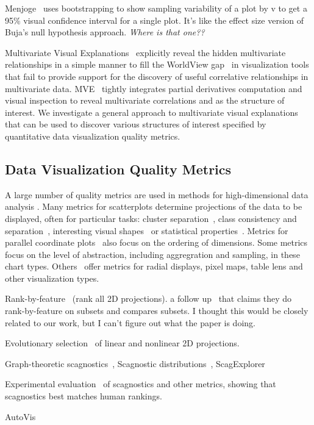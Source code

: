 Menjoge~\cite{Menjoge2010} uses bootstrapping to show sampling variability of a plot by v to get a 95\% visual confidence interval for a single plot. It's like the effect size version of Buja's null hypothesis approach. \textit{Where is that one??}

Multivariate Visual Explanations~\cite{Barlowe2008} explicitly reveal the hidden multivariate relationships in a simple manner to fill the WorldView gap~\cite{Amar2004} in visualization tools that fail to provide support for the discovery of useful correlative relationships in multivariate data. MVE~\cite{Barlowe2008}  tightly integrates partial derivatives computation and visual inspection to reveal multivariate correlations and as the structure of interest. We investigate a general approach to multivariate visual explanations that can be used to discover various structures of interest specified by quantitative data visualization quality metrics.

\subsection{Data Visualization Quality Metrics}
A large number of quality metrics are used in methods for high-dimensional data analysis \cite{Bertini2011}.  Many metrics for scatterplots determine projections of the data to be displayed, often for particular tasks: cluster separation~\cite{Sedlmair2012,Tatu2009}, class consistency and separation~\cite{Sips2009,Schafer2013}, interesting visual shapes~\cite{Wilkinson2005} or statistical properties~\cite{Kandel2012,Seo2005}. Metrics for parallel coordinate plots~\cite{Ankerst1998, Dasgupta2010, Johansson2009, Yang2003} also focus on the ordering of dimensions. Some metrics~\cite{Bertini2006, Cui2006} focus on the level of abstraction, including aggregration and sampling, in these chart types. Others~\cite{Albuquerque2010, Ankerst1998, Schneidewind2006, Yang2003} offer metrics for radial displays, pixel maps, table lens and other visualization types. 


Rank-by-feature~\cite{Seo2005} (rank all 2D projections). a follow up~\cite{Piringer2008} that claims they do rank-by-feature on subsets and compares subsets. I thought this would be closely related to our work, but I can't figure out what the paper is doing.

Evolutionary selection~\cite{Boukhelifa2013} of linear and nonlinear 2D projections.

Graph-theoretic scagnostics~\cite{Wilkinson2005}, Scagnostic distributions~\cite{Wilkinson2008}, ScagExplorer~\cite{Dang2014}

Experimental evaluation~\cite{Lehmann2015} of scagnostics and other metrics, showing that scagnostics best matches human rankings.

AutoVis~\cite{Wills2010}

